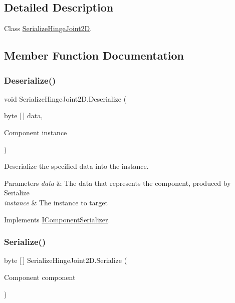 \subsection{Detailed Description}
Class \hyperlink{class_serialize_hinge_joint2_d}{Serialize\+Hinge\+Joint2D}. 



\subsection{Member Function Documentation}
\mbox{\label{class_serialize_hinge_joint2_d_aad33e878c1b722e388f05fe1892157e8}} 
\subsubsection{\texorpdfstring{Deserialize()}{Deserialize()}}
{\footnotesize\ttfamily void Serialize\+Hinge\+Joint2\+D.\+Deserialize (\begin{DoxyParamCaption}\item[{byte \mbox{[}$\,$\mbox{]}}]{data,  }\item[{Component}]{instance }\end{DoxyParamCaption})\hspace{0.3cm}{\ttfamily [inline]}}



Deserialize the specified data into the instance. 


\begin{DoxyParams}{Parameters}
{\em data} & The data that represents the component, produced by Serialize\\
\hline
{\em instance} & The instance to target\\
\hline
\end{DoxyParams}


Implements \hyperlink{interface_i_component_serializer_a4cc366a5c78b33d47a90c209d8fed883}{I\+Component\+Serializer}.

\mbox{\label{class_serialize_hinge_joint2_d_a1e2a66811e08e2e87ea97ca28b65b844}} 
\subsubsection{\texorpdfstring{Serialize()}{Serialize()}}
{\footnotesize\ttfamily byte \mbox{[}$\,$\mbox{]} Serialize\+Hinge\+Joint2\+D.\+Serialize (\begin{DoxyParamCaption}\item[{Component}]{component }\end{DoxyParamCaption})\hspace{0.3cm}{\ttfamily [inline]}}



